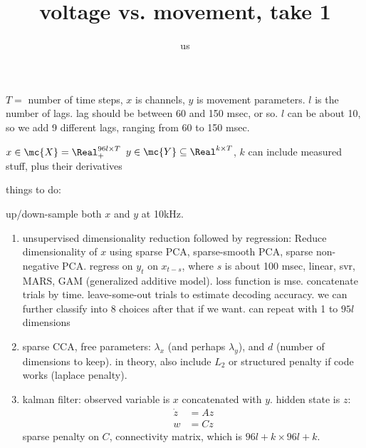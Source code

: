  

\title{voltage vs. movement, take 1}

\author{us}



\maketitle
% 

$T=$ number of time steps, $x$ is channels, $y$ is movement parameters. $l$ is the number of lags. lag should be between 60 and 150 msec, or so.  $l$ can be about 10, so we add 9 different lags, ranging from 60 to 150 msec.

$x \in \mc{X} =\Real_+^{96l \times T}$
$y \in \mc{Y} \subseteq \Real^{k \times T}$, $k$ can include measured stuff, plus their derivatives

things to do:

up/down-sample both $x$ and $y$ at 10kHz.

\begin{enumerate}
	\item unsupervised dimensionality reduction followed by regression: Reduce dimensionality of $x$ using sparse PCA, sparse-smooth PCA, sparse non-negative PCA.  regress on $y_t$ on $x_{t-s}$, where $s$ is about 100 msec, linear, svr, MARS, GAM (generalized additive model). loss function is mse.  concatenate trials by time. leave-some-out trials to estimate decoding accuracy.  we can further classify into 8 choices after that if we want. can repeat with 1 to $95l$ dimensions
	\item sparse CCA, free parameters: $\lambda_x$ (and perhaps $\lambda_y$), and $d$ (number of dimensions to keep).  in theory, also include $L_2$ or structured penalty if code works (laplace penalty).
	\item kalman filter: observed variable is $x$ concatenated with $y$.  hidden state is $z$:
	\begin{align}
		\dot{z} &= A z \\
		w &= C z
	\end{align}
sparse penalty on $C$, connectivity matrix, which is $96l+k \times 96l+k$.  
\end{enumerate}


% 

% 


%

%


